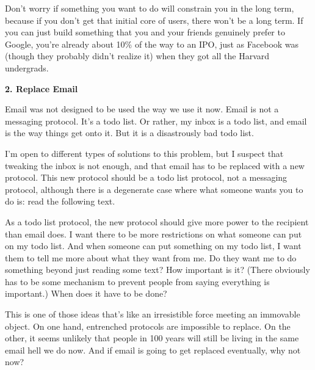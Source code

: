 Don't
                  worry if something you want to do will constrain you in the
                  long term, because if you don't get that initial core of
                  users, there won't be a long term. If you can just build
                  something that you and your friends genuinely prefer to
                  Google, you're already about 10\% of the way to an IPO, just as
                  Facebook was (though they probably didn't realize it) when
                  they got all the Harvard undergrads.

\textbf{2. Replace Email}

Email was not designed to be used the way we use
                  it now. Email is not a messaging protocol. It's a todo list.
                  Or rather, my inbox is a todo list, and email is the way
                  things get onto it. But it is a disastrously bad todo list.

I'm
                  open to different types of solutions to this problem, but I
                  suspect that tweaking the inbox is not enough, and that email
                  has to be replaced with a new protocol. This new protocol
                  should be a todo list protocol, not a messaging protocol,
                  although there is a degenerate case where what someone wants
                  you to do is: read the following text.

As a todo
                  list protocol, the new protocol should give more power to the
                  recipient than email does. I want there to be more
                  restrictions on what someone can put on my todo list. And when
                  someone can put something on my todo list, I want them to tell
                  me more about what they want from me. Do they want me to do
                  something beyond just reading some text? How important is it?
                  (There obviously has to be some mechanism to prevent people
                  from saying everything is important.) When does it have to be
                  done?

This is one of those ideas that's like an
                  irresistible force meeting an immovable object. On one hand,
                  entrenched protocols are impossible to replace. On the other,
                  it seems unlikely that people in 100 years will still be
                  living in the same email hell we do now. And if email is going
                  to get replaced eventually, why not now?

